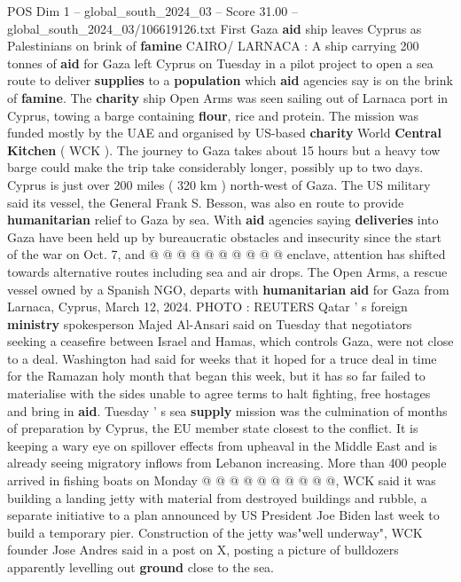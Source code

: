\begin{textsample}{POS Dim 1 – global\_south\_2024\_03 – Score 31.00 – global\_south\_2024\_03/106619126.txt}  \label{ex:f1_pos_016}
First Gaza \textbf{aid} ship leaves Cyprus as Palestinians on brink of \textbf{famine} CAIRO/ LARNACA : A ship carrying 200 tonnes of \textbf{aid} for Gaza left Cyprus on Tuesday in a pilot project to open a sea route to deliver \textbf{supplies} to a \textbf{population} which \textbf{aid} agencies say is on the brink of \textbf{famine}.
The \textbf{charity} ship Open Arms was seen sailing out of Larnaca port in Cyprus, towing a barge containing \textbf{flour}, rice and protein.
The mission was funded mostly by the UAE and organised by US-based \textbf{charity} World \textbf{Central} \textbf{Kitchen} ( WCK ).
The journey to Gaza takes about 15 hours but a heavy tow barge could make the trip take considerably longer, possibly up to two days.
Cyprus is just over 200 miles ( 320 km ) north-west of Gaza.
The US military said its vessel, the General Frank S.
Besson, was also en route to provide \textbf{humanitarian} relief to Gaza by sea.
With \textbf{aid} agencies saying \textbf{deliveries} into Gaza have been held up by bureaucratic obstacles and insecurity since the start of the war on Oct. 7, and @ @ @ @ @ @ @ @ @ @ enclave, attention has shifted towards alternative routes including sea and air drops.
The Open Arms, a rescue vessel owned by a Spanish NGO, departs with \textbf{humanitarian} \textbf{aid} for Gaza from Larnaca, Cyprus, March 12, 2024.
PHOTO : REUTERS Qatar ' s foreign \textbf{ministry} spokesperson Majed Al-Ansari said on Tuesday that negotiators seeking a ceasefire between Israel and Hamas, which controls Gaza, were not close to a deal.
Washington had said for weeks that it hoped for a truce deal in time for the Ramazan holy month that began this week, but it has so far failed to materialise with the sides unable to agree terms to halt fighting, free hostages and bring in \textbf{aid}.
Tuesday ' s sea \textbf{supply} mission was the culmination of months of preparation by Cyprus, the EU member state closest to the conflict.
It is keeping a wary eye on spillover effects from upheaval in the Middle East and is already seeing migratory inflows from Lebanon increasing.
More than 400 people arrived in fishing boats on Monday @ @ @ @ @ @ @ @ @ @, WCK said it was building a landing jetty with material from destroyed buildings and rubble, a separate initiative to a plan announced by US President Joe Biden last week to build a temporary pier.
Construction of the jetty was"well underway", WCK founder Jose Andres said in a post on X, posting a picture of bulldozers apparently levelling out \textbf{ground} close to the sea.

\end{textsample}
